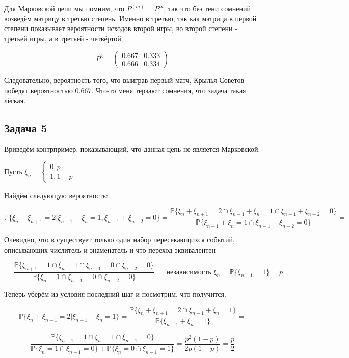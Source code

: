 \documentclass[a4paper,12pt]{article}
\def \mbb{\mathbb}
\def \P{\mbb{P}}
\begin{document}
Для Марковской цепи мы помним, что $ P^{(m)} = P^m$, так что без тени сомнений возведём матрицу в третью степень. Именно в третью, так как матрица в первой степени показывает вероятности исходов второй игры, во второй степени - третьей игры, а в третьей - четвёртой.

\[ P^3 = \begin{pmatrix}
0.667 & 0.333 \\
0.666 & 0.334
\end{pmatrix} \]

Следовательно, вероятность того, что выиграв первый матч, Крылья Советов победят вероятностью 0.667. Что-то меня терзают сомнения, что задача такая лёгкая.

\subsection{Задача 5}

Вриведём контрпример, показывающий, что данная цепь не является Марковской.

Пусть $ \xi_n = \begin{cases}
0, p\\
1, 1-p
\end{cases} $

Найдём следующую вероятность:

\[ \P\{ \xi_n + \xi_{n+1} = 2 | \xi_{n-1} + \xi_n = 1 , \xi_{n-1} + \xi_{n-2} = 0 \} = \frac{\P\{ \xi_n + \xi_{n+1} = 2 \cap \xi_{n-1} + \xi_n = 1 \cap \xi_{n-1} + \xi_{n-2} = 0 \}}{\P \{ \xi_{n-1} + \xi_n = 1 \cap \xi_{n-1} + \xi_{n-2} = 0 \}} = \]

Очевидно, что в существует только один набор пересекающихся событий, описывающих числитель и знаменатель и что переход эквивалентен

\[ = \frac{\P \{ \xi_{n+1} = 1 \cap \xi_n = 1 \cap \xi_{n-1} = 0 \cap \xi_{n-2} = 0 \}}{\P \{  \xi_n = 1 \cap \xi_{n-1} = 0 \cap \xi_{n-2} = 0 \} }  = \text{ независимость } \xi_n = \P\{ \xi_{n+1} = 1 \} = p\]

Теперь уберём из условия последний шаг и посмотрим, что получится.

\[ \P\{ \xi_n + \xi_{n+1} = 2 | \xi_{n-1} + \xi_n = 1 \} = \frac{\P\{ \xi_n + \xi_{n+1} = 2 \cap \xi_{n-1} + \xi_n = 1 \}}{\P \{ \xi_{n-1} + \xi_n = 1 \} } = \]

\[
\frac{\P \{ \xi_{n+1} = 1 \cap \xi_n = 1 \cap \xi_{n-1} = 0 \}}{\P\{\xi_n = 1 \cap \xi_{n-1} = 0 \} + \P\{\xi_n = 0 \cap \xi_{n-1} = 1 \}} = \frac{p^2(1-p)}{2p(1-p)} = \frac{p}{2}\]
\end{document}
